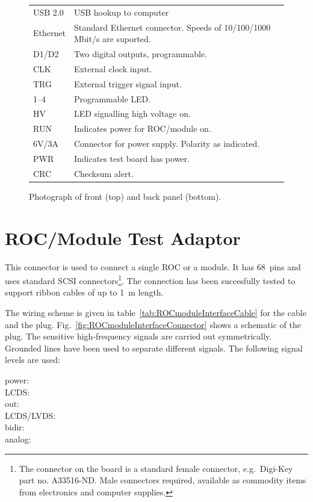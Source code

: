 \begin{figure}[hbtp]
\begin{center}
	\begin{tabular}{lp{10cm}}
	    USB 2.0 & USB hookup to computer \\
	    Ethernet & Standard Ethernet connector. Speeds of 10/100/1000\,Mbit/s are suported. \\
	    D1/D2 & Two digital outputs, programmable. \\
	    CLK & External clock input. \\
	    TRG & External trigger signal input. \\
	    1--4 & Programmable LED. \\
	    HV & LED signalling high voltage on. \\
	    RUN & Indicates power for ROC/module on. \\
	    6V/3A & Connector for power supply. Polarity as indicated. \\
	    PWR & Indicates test board has power. \\
	    CRC & Checksum alert. \todo{Explain} \\
	\end{tabular}
	\label{fig:DTBphotoPanels}
	\caption{Photograph of front (top) and back panel (bottom).}
    \end{center}
\end{figure}

\section{ROC/Module Test Adaptor} \label{sec:ROCadapter}

This connector is used to connect a single \gls{ROC} or a module. It has 68~pins and uses standard SCSI connectors\footnote{The connector on the board is a standard female connector, e.g.~Digi-Key part no. A33516-ND. Male connectors required, available as commodity items from electronics and computer supplies.}. The connection has been succesfully tested to support ribbon cables of up to 1~m length.


The wiring scheme is given in table~\ref{tab:ROCmoduleInterfaceCable} for the cable and the plug. Fig.~\ref{fig:ROCmoduleInterfaceConnector} shows a schematic of the plug. The sensitive high-frequency signals are carried out symmetrically. Grounded lines have been used to separate different signals. The following signal levels are used:

\begin{description}
    \item[power:]
    \item[LCDS:]
    \item[out:]
    \item[LCDS/LVDS:]
    \item[bidir:]
    \item[analog:]
\end{description}

